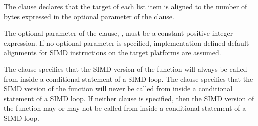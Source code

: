 \begin{samepage}
\begin{fortranspecific}
The  clause declares that the target of each list item is aligned to the number
of bytes expressed in the optional parameter of the  clause.
\end{fortranspecific}
\end{samepage}

The optional parameter of the  clause, , must be a constant positive
integer expression. If no optional parameter is specified, implementation-defined default
alignments for SIMD instructions on the target platforms are assumed.

The  clause specifies that the SIMD version of the function will always be called from inside a
conditional statement of a SIMD loop. The  clause specifies that the
SIMD version of the function will never be called from inside a conditional statement of a SIMD loop. If
neither clause is specified, then the SIMD version of the function may or may not be called from inside a
conditional statement of a SIMD loop.

